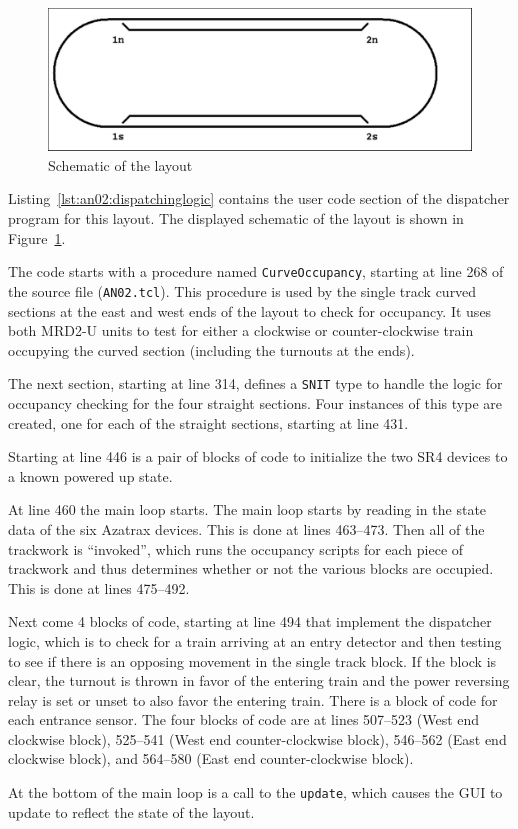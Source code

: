 \begin{figure}[hbpt]\begin{centering}
\includegraphics[width=5in]{AN02_schematic_rev.pdf}
\caption{Schematic of the layout}
\label{fig:an02log:AN02_schematic_rev}
\end{centering}
\end{figure}
Listing~\ref{lst:an02:dispatchinglogic} contains the user code section
of the dispatcher program for this layout. The displayed schematic of
the layout is shown in Figure~\ref{fig:an02log:AN02_schematic_rev}.

The code starts with a procedure named \texttt{CurveOccupancy}, starting
at line 268 of the source file (\texttt{AN02.tcl}). This procedure is
used by the single track curved sections at the east and west ends of
the layout to check for occupancy. It uses both MRD2-U units to test for
either a clockwise or counter-clockwise train occupying the curved
section (including the turnouts at the ends).

The next section, starting at line 314, defines a \texttt{SNIT} type to
handle the logic for occupancy checking for the four straight sections.
Four instances of this type are created, one for each of the straight
sections, starting at line 431.

Starting at line 446 is a pair of blocks of code to initialize the two
SR4 devices to a known powered up state.

At line 460 the main loop starts. The main loop starts by reading in the
state data of the six Azatrax devices.  This is done at lines 463--473.
Then all of the trackwork is ``invoked'', which runs the occupancy
scripts for each piece of trackwork and thus determines whether or not
the various blocks are occupied.  This is done at lines 475--492.

Next come 4 blocks of code, starting at line 494 that implement the
dispatcher logic, which is to check for a train arriving at an entry
detector and then testing to see if there is an opposing movement in
the single track block.  If the block is clear, the turnout is thrown
in favor of the entering train and the power reversing relay is set or
unset to also favor the entering train. There is a block of code for
each entrance sensor.  The four blocks of code are at lines 507--523
(West end clockwise block), 525--541 (West end counter-clockwise
block), 546--562 (East end clockwise block), and 564--580 (East end
counter-clockwise block).

At the bottom of the main loop is a call to the \texttt{update}, which
causes the GUI to update to reflect the state of the layout.



